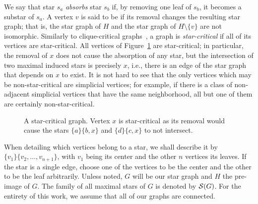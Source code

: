We say that star $s_a$ \textit{absorbs} star $s_b$ if, by removing one leaf of $s_b$, it becomes a substar of $s_a$.
A vertex $v$ is said to be  if its removal changes the resulting star graph; that is, the star graph of $H$ and the star graph of $H \setminus \{v\}$ are not isomorphic.
Similarly to clique-critical graphs~\citep{clique_critical_toft,clique_critical_alcon}, a graph is \textit{star-critical} if all of its vertices are star-critical.
All vertices of Figure~\ref{fig:example_critical} are star-critical; in particular, the removal of $x$ does not cause the absorption of any star, but the intersection of two maximal induced stars is precisely $x$, i.e., there is an edge of the star graph that depends on $x$ to exist.
It is not hard to see that the only vertices which may be non-star-critical are simplicial vertices; for example, if there is a class of non-adjacent simplicial vertices that have the same neighborhood, all but one of them are certainly non-star-critical.


\begin{figure}[!tb]
    \centering
        \caption{A star-critical graph. Vertex $x$ is star-critical as its removal would cause the stars $\{a\}\{b,x\}$ and $\{d\}\{c,x\}$ to not intersect.\label{fig:example_critical}}
\end{figure}


When detailing which vertices belong to a star, we shall describe it by $\{v_1\}\{v_2, \dots, v_{n+1}\}$, with $v_1$ being its center and the other $n$ vertices its leaves.
If the star is a single edge, choose one of the vertices to be the center and the other to be the leaf arbitrarily.
Unless noted, $G$ will be our star graph and $H$ the pre-image of $G$.
The family of all maximal stars of $G$ is denoted by $\mathcal{S}(G)$.
For the entirety of this work, we assume that all of our graphs are connected.



